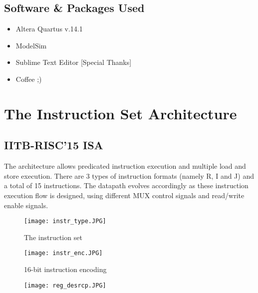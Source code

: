 \documentclass[11pt,fleqn,oneside]{book} %
\begin{document}
\section{Software \& Packages Used}

\begin{itemize}
\item Altera Quartus v.14.1
\item ModelSim
\item Sublime Text Editor [Special Thanks]
\item Coffee ;) 
\end{itemize}

\chapter{The Instruction Set Architecture}

\section{IITB-RISC'15 ISA}
The architecture allows predicated instruction execution and multiple load and store execution. There are 3 types of instruction formats (namely R, I and J) and a total of 15 instructions. The datapath evolves accordingly as these instruction execution flow is designed, using different MUX control signals and read/write enable signals.
  

\begin{figure}[h]
    \centering
    \texttt{[image: instr\_type.JPG]}
    \caption{The instruction set }
    \label{fig:awesome_image}
\end{figure}


\vspace{3cm}

\begin{figure}[h]
    \centering
    \texttt{[image: instr\_enc.JPG]}
    \caption{16-bit instruction encoding }
    \label{fig:awesome_image}
\end{figure}

\hspace*{-2cm}\begin{figure}[h]
        \texttt{[image: reg\_desrcp.JPG]}
    \label{fig:awesome_image}
\end{figure}
\end{document}
